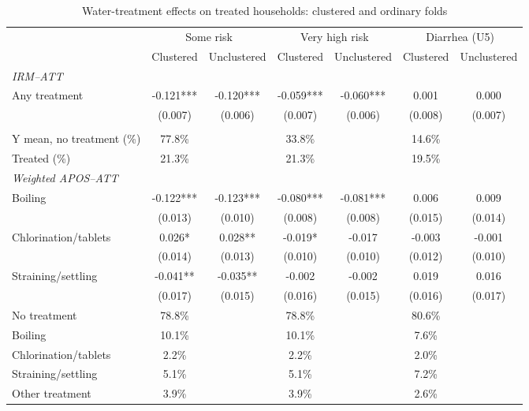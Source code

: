 \begin{table}[htbp]
\centering
\caption{Water-treatment effects on treated households: clustered and ordinary folds}
\label{tab:water-treatment-appendix}
\scriptsize
\setlength{\tabcolsep}{4pt}
\renewcommand{\arraystretch}{0.92}
\begin{adjustbox}{max width=\linewidth}
\begin{tabular}{lcccccc}
\hline\hline
 & \multicolumn{2}{c}{Some risk} & \multicolumn{2}{c}{Very high risk} & \multicolumn{2}{c}{Diarrhea (U5)} \\
 & Clustered & Unclustered & Clustered & Unclustered & Clustered & Unclustered \\
\hline
\multicolumn{7}{l}{\textit{IRM--ATT}} \\
Any treatment & -0.121*** & -0.120*** & -0.059*** & -0.060*** & 0.001 & 0.000 \\
 & (0.007) & (0.006) & (0.007) & (0.006) & (0.008) & (0.007) \\
\addlinespace[6pt]
\multicolumn{7}{l}{\textit{Descriptive statistics}} \\
Y mean, no treatment (\%) & 77.8\% &  & 33.8\% &  & 14.6\% &  \\
Treated (\%) & 21.3\% &  & 21.3\% &  & 19.5\% &  \\
\midrule
\multicolumn{7}{l}{\textit{Weighted APOS--ATT}} \\
Boiling & -0.122*** & -0.123*** & -0.080*** & -0.081*** & 0.006 & 0.009 \\
 & (0.013) & (0.010) & (0.008) & (0.008) & (0.015) & (0.014) \\
Chlorination/tablets & 0.026* & 0.028** & -0.019* & -0.017 & -0.003 & -0.001 \\
 & (0.014) & (0.013) & (0.010) & (0.010) & (0.012) & (0.010) \\
Straining/settling & -0.041** & -0.035** & -0.002 & -0.002 & 0.019 & 0.016 \\
 & (0.017) & (0.015) & (0.016) & (0.015) & (0.016) & (0.017) \\
\addlinespace[6pt]
No treatment & 78.8\% &  & 78.8\% &  & 80.6\% &  \\
Boiling & 10.1\% &  & 10.1\% &  & 7.6\% &  \\
Chlorination/tablets & 2.2\% &  & 2.2\% &  & 2.0\% &  \\
Straining/settling & 5.1\% &  & 5.1\% &  & 7.2\% &  \\
Other treatment & 3.9\% &  & 3.9\% &  & 2.6\% &  \\

\end{tabular}
\end{adjustbox}
\end{table}
